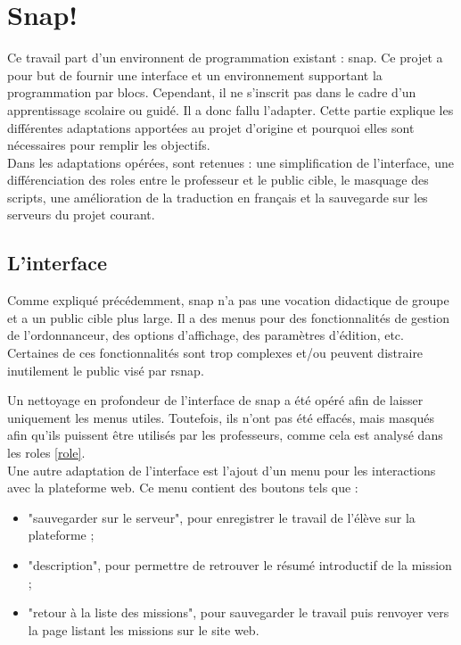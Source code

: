 \section{Snap!}
\label{solution SNAP}
Ce travail part d'un environnent de programmation existant : \gls{snap}. Ce projet a pour but de fournir une interface et un environnement supportant la programmation par \glspl{bloc}. Cependant, il ne s'inscrit pas dans le cadre d'un apprentissage scolaire ou guidé. Il a donc fallu l'adapter. Cette partie explique les différentes adaptations apportées au projet d'origine et pourquoi elles sont nécessaires pour remplir les objectifs.\\

Dans les adaptations opérées, sont retenues : une simplification de l'interface, une différenciation des \glspl{role} entre le professeur et le public cible, le masquage des \glspl{script}, une amélioration de la traduction en français et la sauvegarde sur les serveurs du projet courant.

\subsection{L'interface}
\label{interface}
Comme expliqué précédemment, \gls{snap} n'a pas une vocation didactique de groupe et a un public cible plus large. Il a des menus pour des fonctionnalités de gestion de l'ordonnanceur, des options d'affichage, des paramètres d'édition, etc. Certaines de ces fonctionnalités sont trop complexes et/ou peuvent distraire inutilement le public visé par \gls{rsnap}.

Un nettoyage en profondeur de l'interface de \gls{snap} a été opéré afin de laisser uniquement les menus utiles. Toutefois, ils n'ont pas été effacés, mais masqués afin qu'ils puissent être utilisés par les professeurs, comme cela est analysé dans les \glspl{role} \ref{role}.\\

Une autre adaptation de l'interface est l'ajout d'un menu pour les interactions avec la plateforme web. Ce menu contient des boutons tels que :
\begin{itemize}
  \item "sauvegarder sur le serveur", pour enregistrer le travail de l'élève sur la plateforme ;
  \item "description", pour permettre de retrouver le résumé introductif de la \gls{mission} ;
  \item "retour à la liste des missions", pour sauvegarder le travail puis renvoyer vers la page listant les \glspl{mission} sur le site web.
\end{itemize}

